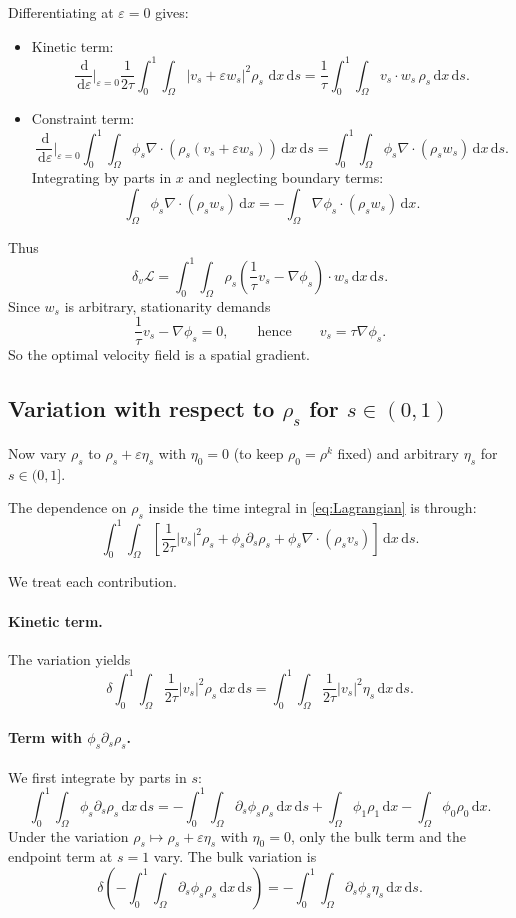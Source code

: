 \documentclass[11pt]{article}
\numberwithin{equation}{section}
\theoremstyle{definition}
\newcommand{\dd}{\,\mathrm{d}}
\begin{document}
Differentiating at $\varepsilon=0$ gives:
\begin{itemize}
\item Kinetic term:
\[
\frac{\dd}{\dd\varepsilon}\bigg|_{\varepsilon=0}
\frac{1}{2\tau}\int_0^1\!\!\int_{\Omega} |v_s+\varepsilon w_s|^2 \rho_s
\,\dd x\dd s
= \frac{1}{\tau}\int_0^1\!\!\int_{\Omega} v_s\cdot w_s\,\rho_s\dd x\dd s.
\]
\item Constraint term:
\[
\frac{\dd}{\dd\varepsilon}\bigg|_{\varepsilon=0}
\int_0^1\!\!\int_{\Omega} \phi_s\nabla\cdot\left(\rho_s(v_s+\varepsilon w_s)\right)\dd x\dd s
= \int_0^1\!\!\int_{\Omega} \phi_s \nabla\cdot(\rho_s w_s)\dd x\dd s.
\]
Integrating by parts in $x$ and neglecting boundary terms:
\[
\int_{\Omega} \phi_s \nabla\cdot(\rho_s w_s)\dd x
= -\int_{\Omega} \nabla\phi_s\cdot (\rho_s w_s)\dd x.
\]
\end{itemize}
Thus
\[
\delta_v \mathcal{L}
= \int_0^1\!\!\int_{\Omega}
\rho_s\left(
\frac{1}{\tau}v_s - \nabla\phi_s
\right)\cdot w_s \dd x\dd s.
\]
Since $w_s$ is arbitrary, stationarity demands
\begin{equation}
\label{eq:vs-gradient-phi}
\frac{1}{\tau}v_s - \nabla\phi_s = 0,
\qquad\text{hence}\qquad
v_s = \tau \nabla\phi_s.
\end{equation}
So the optimal velocity field is a spatial gradient.

\subsection{Variation with respect to $\rho_s$ for $s\in(0,1)$}

Now vary $\rho_s$ to $\rho_s + \varepsilon \eta_s$ with $\eta_0 = 0$ (to keep $\rho_0 = \rho^k$ fixed) and arbitrary $\eta_s$ for $s\in(0,1]$.

The dependence on $\rho_s$ inside the time integral in \eqref{eq:Lagrangian} is through:
\[
\int_0^1\!\!\int_{\Omega}
\left[
\frac{1}{2\tau}|v_s|^2 \rho_s
+ \phi_s \partial_s\rho_s
+ \phi_s \nabla\cdot(\rho_s v_s)
\right]\dd x\dd s.
\]

We treat each contribution.

\paragraph{Kinetic term.}
The variation yields
\[
\delta \int_0^1\!\!\int_{\Omega} \frac{1}{2\tau}|v_s|^2 \rho_s\dd x\dd s
= \int_0^1\!\!\int_{\Omega} \frac{1}{2\tau}|v_s|^2 \eta_s\dd x\dd s.
\]

\paragraph{Term with $\phi_s \partial_s\rho_s$.}
We first integrate by parts in $s$:
\[
\int_0^1\!\!\int_{\Omega} \phi_s \partial_s \rho_s\dd x\dd s
= -\int_0^1\!\!\int_{\Omega} \partial_s\phi_s \rho_s\dd x\dd s
+ \int_{\Omega} \phi_1 \rho_1\dd x - \int_{\Omega} \phi_0 \rho_0\dd x.
\]
Under the variation $\rho_s \mapsto \rho_s + \varepsilon \eta_s$ with $\eta_0 = 0$, only the bulk term and the endpoint term at $s=1$ vary. The bulk variation is
\[
\delta \left(
-\int_0^1\!\!\int_{\Omega} \partial_s\phi_s \rho_s\dd x\dd s
\right)
= -\int_0^1\!\!\int_{\Omega} \partial_s\phi_s \eta_s\dd x\dd s.
\]
\end{document}
